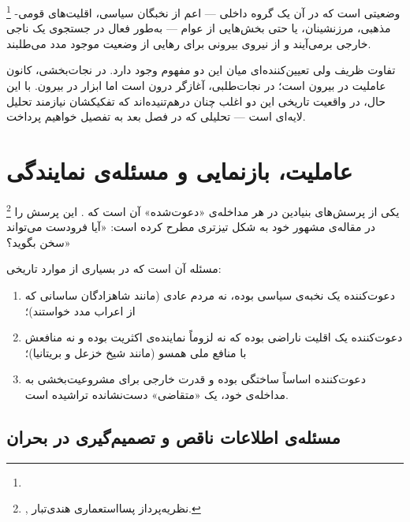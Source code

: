 \begin{tcolorbox}[defbox, title={تعریف: نجات‌طلبی}]
%
\footnote{}
وضعیتی است که در آن یک گروه داخلی --- اعم از نخبگان سیاسی، اقلیت‌های
قومی-مذهبی، مرزنشینان، یا حتی بخش‌هایی از عوام --- به‌طور فعال
در جستجوی یک ناجی خارجی برمی‌آیند و از نیروی بیرونی برای رهایی
از وضعیت موجود مدد می‌طلبند.
\end{tcolorbox}

تفاوت ظریف ولی تعیین‌کننده‌ای میان این دو مفهوم وجود دارد. در
نجات‌بخشی، کانون عاملیت در بیرون است؛ در نجات‌طلبی، آغازگر درون
است اما ابزار در بیرون. با این حال، در واقعیت تاریخی این دو اغلب
چنان درهم‌تنیده‌اند که تفکیکشان نیازمند تحلیل لایه‌ای است ---
تحلیلی که در فصل بعد به تفصیل خواهیم پرداخت.


\section{عاملیت، بازنمایی و مسئله‌ی نمایندگی}
\label{sec:ch01-agency}

یکی از پرسش‌های بنیادین در هر مداخله‌ی «دعوت‌شده» آن است که
. این پرسش را
\footnote{,
نظریه‌پرداز پسااستعماری هندی‌تبار.}
در مقاله‌ی مشهور خود به شکل تیزتری مطرح کرده است: «آیا فرودست
می‌تواند سخن بگوید؟»

مسئله آن است که در بسیاری از موارد تاریخی:
\begin{enumerate}[label=\textbf{\arabic*.}, nosep, rightmargin=1em]
  \item دعوت‌کننده یک نخبه‌ی سیاسی بوده، نه مردم عادی (مانند شاهزادگان
    ساسانی که از اعراب مدد خواستند)؛
  \item دعوت‌کننده یک اقلیت ناراضی بوده که نه لزوماً نماینده‌ی اکثریت
    بوده و نه منافعش با منافع ملی همسو (مانند شیخ خزعل و بریتانیا)؛
  \item دعوت‌کننده اساساً ساختگی بوده و قدرت خارجی برای مشروعیت‌بخشی
    به مداخله‌ی خود، یک «متقاضی» دست‌نشانده تراشیده است.
\end{enumerate}

\subsection{مسئله‌ی اطلاعات ناقص و تصمیم‌گیری در بحران}
\label{subsec:ch01-info}

